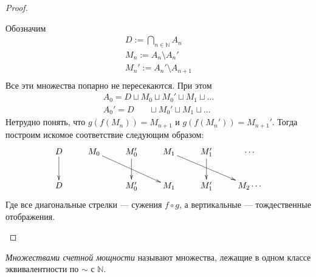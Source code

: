 \begin{proof}
\begin{itemize}
        Обозначим
        \begin{gather*}
            D := \bigcap_{n \in \mathbb{N}}{A_n} \\
            M_n := A_n \setminus A_n' \\
            M_n' := A_n' \setminus A_{n + 1} \\
        \end{gather*}
        Все эти множества попарно не пересекаются. При этом
        \begin{gather*}
            A_0 = D \sqcup M_0 \sqcup M_0' \sqcup M_1 \sqcup \ldots \\
            A_0' = D ~~~~~~~~ \sqcup M_0' \sqcup M_1 \sqcup \ldots
        \end{gather*}
        Нетрудно понять, что $g(f(M_n)) = M_{n+1}$ и $g(f(M_n')) = M_{n+1}'$.
        Тогда построим искомое соответствие следующим образом:
        \begin{displaymath}
            \xymatrix{ D \ar[d] & M_0 \ar[drr] & M_0' \ar[d] & M_1 \ar[drr]
            & M_1' \ar[d] & \cdots \\
                       D & & M_0' & M_1 & M_1' & M_2\cdots }
        \end{displaymath}
        Где все диагональные стрелки --- сужения $f \circ g$, а вертикальные ---
        тождественные отображения.
    \end{itemize}
\end{proof}

\begin{definition}
    \textit{Множествами счетной мощности} называют множества, лежащие в одном
    классе эквивалентности по $\sim$ с $\mathbb{N}$.
\end{definition}

